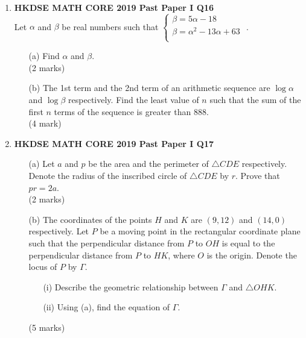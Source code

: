 \documentclass[12pt]{article}
\begin{document}
\begin{enumerate}
	\item \textbf{HKDSE MATH CORE 2019 Past Paper I Q16}\\
	Let $\alpha$ and $\beta$ be real numbers such that $\left\{\begin{matrix}
		\beta  =  5\alpha  -  18 \\
		\beta = \alpha^2 - 13\alpha + 63\\
		\end{matrix}\right.$ .
	\begin{enumerate}
		\item[(a)] Find $\alpha$ and $\beta$. \\(2 marks)
		\item[(b)] The 1st term and the 2nd term of an arithmetic sequence are $\log{\alpha}$ and $\log{\beta}$ respectively. Find the least value of $n$ such that the sum of the first $n$ terms of the sequence is greater than 888. \\(4 mark)
	\end{enumerate}

	\item \textbf{HKDSE MATH CORE 2019 Past Paper I Q17}
	\begin{enumerate}
		\item[(a)] Let $a$ and $p$ be the area and the perimeter of $\triangle CDE$ respectively. Denote the radius of the inscribed circle of $\triangle CDE$ by $r$. Prove that $pr = 2a$. \\(2 marks)
		\item[(b)] The coordinates of the points $H$ and $K$ are $(9, 12)$ and $(14, 0)$ respectively. Let $P$ be a moving point in the rectangular coordinate plane such that the perpendicular distance from $P$ to $OH$ is equal to the perpendicular distance from $P$ to $HK$, where $O$ is the origin. Denote the locus of $P$ by $\Gamma$.
		\begin{enumerate}
			\item[(i)] Describe the geometric relationship between $\Gamma$ and $\triangle OHK$.
			\item[(ii)] Using (a), find the equation of $\Gamma$.
		\end{enumerate}
		(5 marks)
	\end{enumerate}


\end{enumerate}
\end{document}
